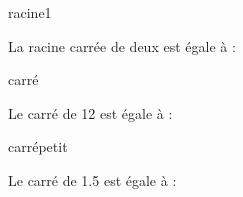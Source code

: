\documentclass[12pt]{extarticle}
\begin{document}
{\begin{exercicebox}
\end{exercicebox}

\begin{exercicebox}

    \begin{question}{racine1}
        \begin{minipage}{0.22\textwidth}
        La racine carrée de deux est égale à :
        \end{minipage}
        \hfill
        \begin{minipage}{0.69\textwidth}
        \begin{reponseshoriz}
        \end{reponseshoriz}
        \end{minipage}
    \end{question}

    \begin{question}{carré}
        \begin{minipage}{0.30\textwidth}
        Le carré de 12 est égale à :
        \end{minipage}
        \hfill
        \begin{minipage}{0.65\textwidth}
        \begin{reponseshoriz}
        \end{reponseshoriz}
        \end{minipage}
    \end{question}

    \begin{question}{carrépetit}
        \begin{minipage}{0.30\textwidth}
        Le carré de 1.5 est égale à :
        \end{minipage}
        \hfill
        \begin{minipage}{0.65\textwidth}
        \begin{reponseshoriz}
        \end{reponseshoriz}
        \end{minipage}
    \end{question}

\end{exercicebox}

}
\end{document}
